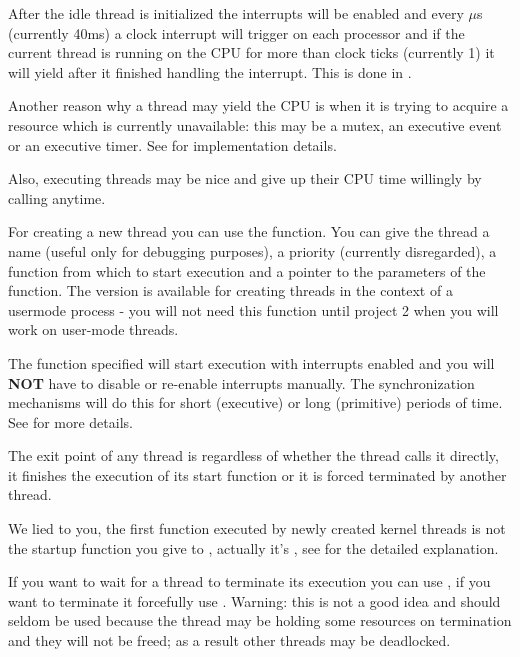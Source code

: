 After the idle thread is initialized the interrupts will be enabled and every
 $\mu$s (currently 40ms) a clock interrupt will trigger
on each processor and if the current thread is running on the CPU for more than
 clock ticks (currently 1) it will yield after it finished handling the
interrupt. This is done in .

Another reason why a thread may yield the CPU is when it is trying to acquire a resource which is
currently unavailable: this may be a mutex, an executive event or an executive timer.
See  for implementation details.

Also, executing threads may be nice and give up their CPU time willingly by calling
 anytime.

For creating a new thread you can use the  function. You can give the thread a
name (useful only for debugging purposes), a priority (currently disregarded), a function from which
to start execution and a pointer to the parameters of the function. The 
version is available for creating threads in the context of a usermode process - you will not need
this function until project 2 when you will work on user-mode threads.

The function specified will start execution with interrupts enabled and you will \textbf{NOT} have
to disable or re-enable interrupts manually. The synchronization mechanisms will do this for short
(executive) or long (primitive) periods of time. See  for more details.

The exit point of any thread is  regardless of whether the thread calls it directly,
it finishes the execution of its start function or it is forced terminated by another thread.

We lied to you, the first function executed by newly created kernel threads is not the startup
function you give to , actually it's , see
 for the detailed explanation.

If you want to wait for a thread to terminate its execution you can use
, if you want to terminate it forcefully use .
Warning: this is not a good idea and should seldom be used because the thread may be holding some
resources on termination and they will not be freed; as a result other threads may be deadlocked.

